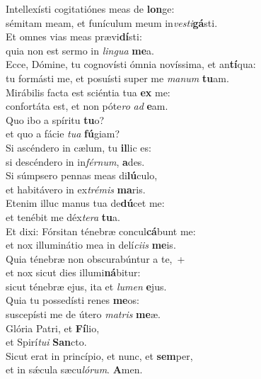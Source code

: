 \evenverse Intellexísti cogitatiónes meas de \textbf{lon}ge:~\*\\
\evenverse sémitam meam, et funículum meum in\textit{ve}\textit{sti}\textbf{gá}sti.\\
\oddverse Et omnes vias meas prævi\textbf{dí}sti:~\*\\
\oddverse quia non est sermo in \textit{lin}\textit{gua} \textbf{me}a.\\
\evenverse Ecce, Dómine, tu cognovísti ómnia novíssima, et an\textbf{tí}qua:~\*\\
\evenverse tu formásti me, et posuísti super me \textit{ma}\textit{num} \textbf{tu}am.\\
\oddverse Mirábilis facta est sciéntia tua \textbf{ex} me:~\*\\
\oddverse confortáta est, et non póte\textit{ro} \textit{ad} \textbf{e}am.\\
\evenverse Quo ibo a spíritu \textbf{tu}o?~\*\\
\evenverse et quo a fácie \textit{tu}\textit{a} \textbf{fú}giam?\\
\oddverse Si ascéndero in cælum, tu \textbf{il}lic es:~\*\\
\oddverse si descéndero in in\textit{fér}\textit{num}, \textbf{a}des.\\
\evenverse Si súmpsero pennas meas di\textbf{lú}culo,~\*\\
\evenverse et habitávero in ex\textit{tré}\textit{mis} \textbf{ma}ris.\\
\oddverse Etenim illuc manus tua de\textbf{dú}cet me:~\*\\
\oddverse et tenébit me déx\textit{te}\textit{ra} \textbf{tu}a.\\
\evenverse Et dixi: Fórsitan ténebræ concul\textbf{cá}bunt me:~\*\\
\evenverse et nox illuminátio mea in delí\textit{ci}\textit{is} \textbf{me}is.\\
\oddverse Quia ténebræ non obscurabúntur a te,~+\\
\oddverse  et nox sicut dies illumi\textbf{ná}bitur:~\*\\
\oddverse sicut ténebræ ejus, ita et \textit{lu}\textit{men} \textbf{e}jus.\\
\evenverse Quia tu possedísti renes \textbf{me}os:~\*\\
\evenverse suscepísti me de útero \textit{ma}\textit{tris} \textbf{me}æ.\\
\oddverse Glória Patri, et \textbf{Fí}lio,~\*\\
\oddverse et Spirí\textit{tu}\textit{i} \textbf{San}cto.\\
\evenverse Sicut erat in princípio, et nunc, et \textbf{sem}per,~\*\\
\evenverse et in sǽcula sæcu\textit{ló}\textit{rum}. \textbf{A}men.\\

